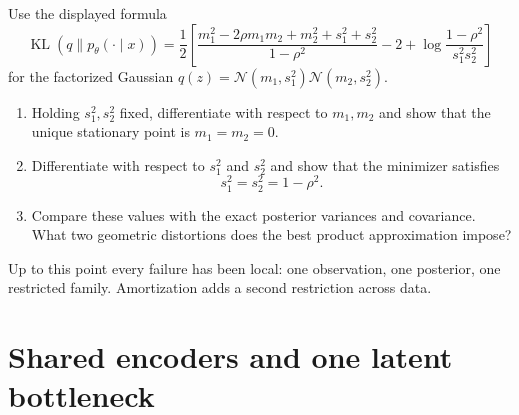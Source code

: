 \documentclass[11pt]{article}
\newif\ifshowsolutions
\newcommand{\SolutionBox}[2][10]{%
  \ifshowsolutions
    \begin{tcolorbox}[stat221panelgray,title={Solution}]
    #2
    \end{tcolorbox}
  \else
    \begin{tcolorbox}[stat221panelgray,unbreakable,title={Workspace}]
    \vspace{#1\baselineskip}
    \end{tcolorbox}
  \fi
}
\begin{document}
\begin{exercise}
\label{ex:mean-field-removes-dependence}
Use the displayed formula
\[
  \operatorname{KL}(q\|p_\theta(\cdot\mid x))
  =
  \frac12\left[
    \frac{m_1^2-2\rho m_1m_2+m_2^2+s_1^2+s_2^2}{1-\rho^2}
    -2
    +
    \log\!\frac{1-\rho^2}{s_1^2s_2^2}
  \right]
\]
for the factorized Gaussian \(q(z)=\mathcal{N}(m_1,s_1^2)\mathcal{N}(m_2,s_2^2)\).
\begin{enumerate}[leftmargin=*]
  \item Holding \(s_1^2,s_2^2\) fixed, differentiate with respect to \(m_1,m_2\) and show that the unique stationary point is \(m_1=m_2=0\).
  \item Differentiate with respect to \(s_1^2\) and \(s_2^2\) and show that the minimizer satisfies
  \[
    s_1^2=s_2^2=1-\rho^2.
  \]
  \item Compare these values with the exact posterior variances and covariance. What two geometric distortions does the best product approximation impose?
\end{enumerate}
\end{exercise}
\SolutionBox[12]{Differentiating the KL with respect to the means gives
\[
  \frac{\partial}{\partial m_1}\operatorname{KL}(q\|p_\theta(\cdot\mid x))
  =
  \frac{m_1-\rho m_2}{1-\rho^2},
  \qquad
  \frac{\partial}{\partial m_2}\operatorname{KL}(q\|p_\theta(\cdot\mid x))
  =
  \frac{m_2-\rho m_1}{1-\rho^2}.
\]
The stationary conditions are
\[
  m_1=\rho m_2,
  \qquad
  m_2=\rho m_1.
\]
Since \(|\rho|<1\), the unique solution is \(m_1=m_2=0\).
For the variances,
\[
  \frac{\partial}{\partial s_j^2}\operatorname{KL}(q\|p_\theta(\cdot\mid x))
  =
  \frac12\left(\frac{1}{1-\rho^2}-\frac{1}{s_j^2}\right),
  \qquad j\in\{1,2\},
\]
so the stationary point is \(s_1^2=s_2^2=1-\rho^2\), which is the minimizer.
The exact posterior has marginal variances \(1\) and covariance \(\rho\), while the best product approximation has variances \(1-\rho^2<1\) and covariance \(0\).
So mean-field imposes two distortions at once: it deletes posterior dependence and it shrinks each marginal variance below the true one.}

Up to this point every failure has been local:
one observation, one posterior, one restricted family.
Amortization adds a second restriction across data.

\section{Shared encoders and one latent bottleneck}
\label{sec:shared-encoder-bottleneck}
\end{document}
